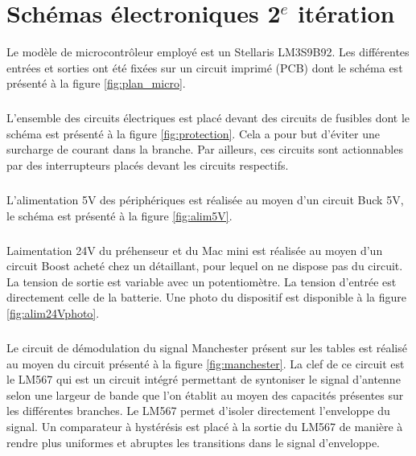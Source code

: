 


\chapter{Schémas électroniques 2$^{e}$ itération}
\label{electronics}
Le modèle de microcontrôleur employé est un Stellaris LM3S9B92. Les différentes entrées et sorties ont été fixées sur un circuit imprimé (PCB) dont le schéma est présenté à la figure \ref{fig:plan_micro}. 
\paragraph{}L'ensemble des circuits électriques est placé devant des circuits de fusibles dont le schéma est présenté à la figure \ref{fig:protection}. Cela a pour but d'éviter une surcharge de courant dans la branche. Par ailleurs, ces circuits sont actionnables par des interrupteurs placés devant les circuits respectifs. 
\paragraph{}L'alimentation 5V des périphériques est réalisée au moyen d'un circuit Buck 5V, le schéma est présenté à la figure \ref{fig:alim5V}.
\paragraph{}Laimentation 24V du préhenseur et du Mac mini est réalisée au moyen d'un circuit Boost acheté chez un détaillant, pour lequel on ne dispose pas du circuit. La tension de sortie est variable avec un potentiomètre. La tension d'entrée est directement celle de la batterie. Une photo du dispositif est disponible à la figure \ref{fig:alim24Vphoto}.
\paragraph{}Le circuit de démodulation du signal Manchester présent sur les tables est réalisé au moyen du circuit présenté à la figure \ref{fig:manchester}. La clef de ce circuit est le LM567 qui est un circuit intégré permettant de syntoniser le signal d'antenne selon une largeur de bande que l'on établit au moyen des capacités présentes sur les différentes branches. Le LM567 permet d'isoler directement l'enveloppe du signal. Un comparateur à hystérésis est placé à la sortie du LM567 de manière à rendre plus uniformes et abruptes les transitions dans le signal d'enveloppe. 
